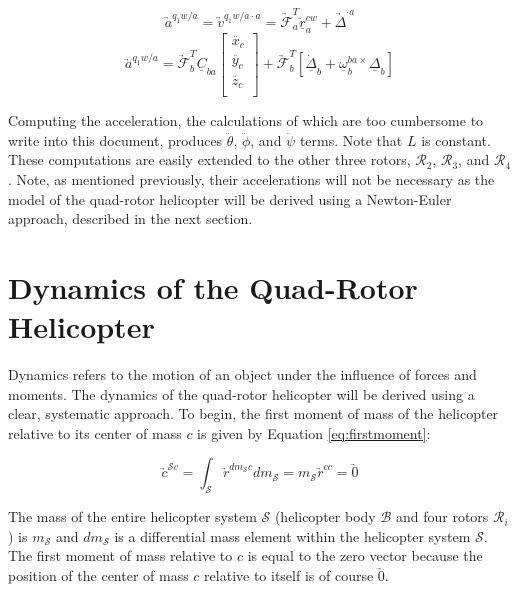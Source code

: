 \documentclass[journal]{IEEEtran}
\begin{document}
\begin{equation}
	\underrightarrow{a}^{q_1w/a}=\underrightarrow{v}^{q_1w/a\cdot{a}}=\underrightarrow{\mathcal{F}}^T_a\underline{\ddot{r}}^{cw}_a+\underrightarrow{\Delta}^{\cdot{a}}
	\label{eq:acc1}
\end{equation}
\begin{equation}
	\underrightarrow{a}^{q_1w/a}=\underrightarrow{\mathcal{F}}^T_b\underline{C}_{ba}\left[ \begin{array}{c}
				\ddot{x_c} \\
				\ddot{y_c} \\
				\ddot{z_c} \\
				\end{array} \right]+\underrightarrow{\mathcal{F}}^T_b[\underline{\dot{\Delta}}_b+\underline{\omega}^{ba\times}_b\underline{\Delta}_b]
	\label{eq:acc2}
\end{equation}

Computing the acceleration, the calculations of which are too cumbersome to write into this document, produces $\ddot{\theta}$, $\ddot{\phi}$, and $\ddot{\psi}$ terms. Note that $L$ is constant. These computations are easily extended to the other three rotors, $\mathcal{R}_2$, $\mathcal{R}_3$, and $\mathcal{R}_4$. Note, as mentioned previously, their accelerations will not be necessary as the model of the quad-rotor helicopter will be derived using a Newton-Euler approach, described in the next section. 

\section{Dynamics of the Quad-Rotor Helicopter}
Dynamics refers to the motion of an object under the influence of forces and moments. The dynamics of the quad-rotor helicopter will be derived using a clear, systematic approach. To begin, the first moment of mass of the helicopter relative to its center of mass $c$ is given by Equation \ref{eq:firstmoment}:

\begin{equation}
	\underrightarrow{c}^{\mathcal{S}c}=\int_{\mathcal{S}}^{} \underrightarrow{r}^{dm_{\mathcal{S}}c} dm_{\mathcal{S}}=m_{\mathcal{S}}\underrightarrow{r}^{cc}=\underrightarrow{0}
	\label{eq:firstmoment}
\end{equation} 

The mass of the entire helicopter system $\mathcal{S}$ (helicopter body $\mathcal{B}$ and four rotors $\mathcal{R}_i$) is $m_{\mathcal{S}}$ and $dm_{\mathcal{S}}$ is a differential mass element within the helicopter system $\mathcal{S}$. The first moment of mass relative to $c$ is equal to the zero vector because the position of the center of mass $c$ relative to itself is of course $\underrightarrow{0}$.  
\end{document}
